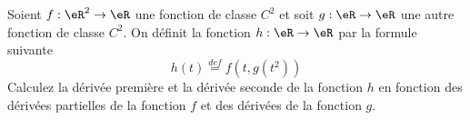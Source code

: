 
\begin{exercice}\label{exo0055}


Soient $f: \eR^2 \rightarrow \eR$ une fonction de classe $C^2$ et
soit $g:\eR \rightarrow \eR$ une autre fonction de classe $C^2$. On définit
la fonction $h:\eR \rightarrow \eR$ par la formule suivante
\[
h(t) \stackrel{def}= f(t,g(t^2))
\]
Calculez la dérivée première et la dérivée seconde de la fonction
$h$ en fonction des dérivées partielles de la fonction $f$ et des
dérivées de la fonction $g$.


\end{exercice}
